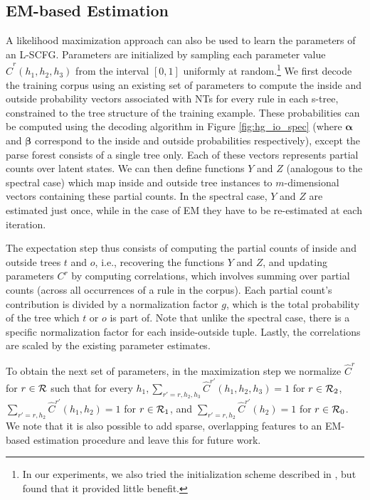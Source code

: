 \documentclass[11pt]{article}
\newcommand{\rules}{{\cal R}}
\newcommand{\e}[1]{\hat{#1}}
\newcommand{\balpha}{\bm{\alpha}}
\newcommand{\bbeta}{\bm{\beta}}
\begin{document}
\subsection{EM-based Estimation}
\label{sec:em}
A likelihood maximization approach can also be used to learn the parameters of an L-SCFG.  
Parameters are initialized by sampling each parameter value $\e{C}^r(h_1, h_2, h_3)$ from the interval $[0,1]$ uniformly at random.\footnote{In our experiments, we also tried the initialization scheme described in , but found that it provided little benefit.}
We first decode the training corpus using an existing set of parameters to compute the inside and outside probability vectors associated with NTs for every rule in each s-tree, constrained to the tree structure of the training example. 
These probabilities can be computed using the decoding algorithm in Figure \ref{fig:hg_io_spec} (where $\balpha$ and $\bbeta$ correspond to the inside and outside probabilities respectively), except the parse forest consists of a single tree only. 
Each of these vectors represents partial counts over latent states.  
We can then define functions $Y$ and $Z$ (analogous to the spectral case) which map inside and outside tree instances to $m$-dimensional vectors containing these partial counts. 
In the spectral case, $Y$ and $Z$ are estimated just once, while in the case of EM they have to be re-estimated at each iteration.

The expectation step thus consists of computing the partial counts of inside and outside trees $t$ and $o$, i.e., recovering the functions $Y$ and $Z$, and updating parameters $C^r$ by computing correlations, which involves summing over partial counts (across all occurrences of a rule in the corpus). 
Each partial count's contribution is divided by a normalization factor $g$, which is the total probability of the tree which $t$ or $o$ is part of.  
Note that unlike the spectral case, there is a specific normalization factor for each inside-outside tuple. 
Lastly, the correlations are scaled by the existing parameter estimates.

To obtain the next set of parameters, in the maximization step we normalize $\e{C}^r$ for $r \in \rules$ such that for every $h_1, \sum_{r'=r,h_2,h_3} \e{C}^{r'}(h_1, h_2, h_3) = 1$ for $r \in \rules_2$, $\sum_{r'=r,h_2} \e{C}^{r'}(h_1, h_2) = 1$ for $r \in \rules_1$, and $\sum_{r'=r,h_2} \e{C}^{r'}(h_2) = 1$ for $r \in \rules_0$.  
We note that it is also possible to add sparse, overlapping features to an EM-based estimation procedure \cite{Berg-Kirkpatrick2010} and leave this for future work.  
\end{document}

